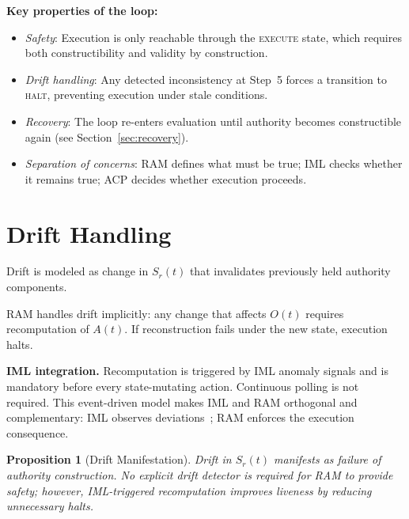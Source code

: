 \documentclass[11pt]{article}
\newtheorem{proposition}{Proposition}
\begin{document}
\noindent\textbf{Key properties of the loop:}
\begin{itemize}
  \item \textit{Safety}: Execution is only reachable through the \textsc{execute} state,
        which requires both constructibility and validity by construction.
  \item \textit{Drift handling}: Any detected inconsistency at Step~5 forces a transition
        to \textsc{halt}, preventing execution under stale conditions.
  \item \textit{Recovery}: The loop re-enters evaluation until authority becomes
        constructible again (see Section~\ref{sec:recovery}).
  \item \textit{Separation of concerns}: RAM defines what must be true; IML checks whether
        it remains true; ACP decides whether execution proceeds.
\end{itemize}

\section{Drift Handling}

Drift is modeled as change in $S_r(t)$ that invalidates previously held authority
components.

RAM handles drift implicitly: any change that affects $O(t)$ requires recomputation of
$A(t)$. If reconstruction fails under the new state, execution halts.

\textbf{IML integration.} Recomputation is triggered by IML anomaly signals and is
mandatory before every state-mutating action. Continuous polling is not required. This
event-driven model makes IML and RAM orthogonal and complementary: IML observes
deviations~\cite{fernandez2026c}; RAM enforces the execution consequence.

\begin{proposition}[Drift Manifestation]
Drift in $S_r(t)$ manifests as failure of authority construction. No explicit drift
detector is required for RAM to provide safety; however, IML-triggered recomputation
improves liveness by reducing unnecessary halts.
\end{proposition}
\end{document}
